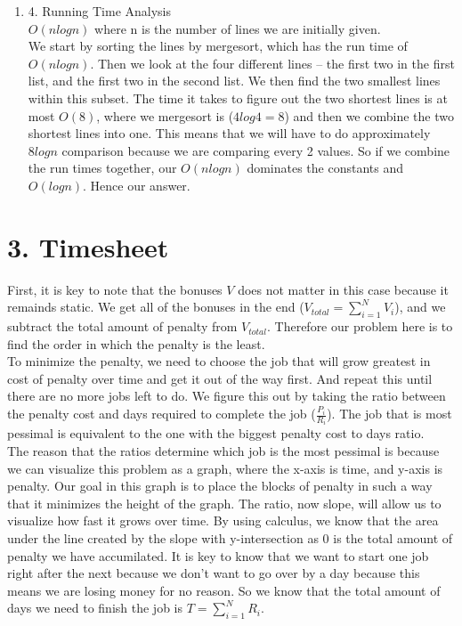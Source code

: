 \documentclass[11pt]{article}
\newenvironment{qparts}{\begin{enumerate}[{(}a{)}]}{\end{enumerate}}
\begin{document}
\begin{qparts}
Since we choose the shortest lines first, we fulfilled our initial key understanding. All the shorter lines are merged first before moving onto the bigger ones. We should always merge lines that are short as this will take less time to merge since it's a lower value. 
\item[4.] Running Time Analysis \\
$O(nlogn)$ where n is the number of lines we are initially given. \\
We start by sorting the lines by mergesort, which has the run time of $O(nlogn)$. Then we look at the four different lines -- the first two in the first list, and the first two in the second list. We then find the two smallest lines within this subset. The time it takes to figure out the two shortest lines is at most $O(8)$, where we mergesort is ($4log4 = 8$) and then we combine the two shortest lines into one. This means that we will have to do approximately $8logn$ comparison because we are comparing every 2 values. So if we combine the run times together, our $O(nlogn)$ dominates the constants and $O(logn)$. Hence our answer. 
\end{qparts}

\newpage
\section*{3. Timesheet}
First, it is key to note that the bonuses $V$ does not matter in this case because it remainds static. We get all of the bonuses in the end ($V_{total} = \sum_{i=1}^{N} V_i$), and we subtract the total amount of penalty from $V_{total}$. Therefore our problem here is to find the order in which the penalty is the least. \\

To minimize the penalty, we need to choose the job that will grow greatest in cost of penalty over time and get it out of the way first. And repeat this until there are no more jobs left to do. We figure this out by taking the ratio between the penalty cost and days required to complete the job ($\frac{P_i}{R_i}$). The job that is most pessimal is equivalent to the one with the biggest penalty cost to days ratio. \\


The reason that the ratios determine which job is the most pessimal is because we can visualize this problem as a graph, where the x-axis is time, and y-axis is penalty. Our goal in this graph is to place the blocks of penalty in such a way that it minimizes the height of the graph. The ratio, now slope, will allow us to visualize how fast it grows over time. By using calculus, we know that the area under the line created by the slope with y-intersection as 0 is the total amount of penalty we have accumilated. It is key to know that we want to start one job right after the next because we don't want to go over by a day because this means we are losing money for no reason. So we know that the total amount of days we need to finish the job is $T = \sum_{i=1}^{N} R_i$. \\
\end{document}
